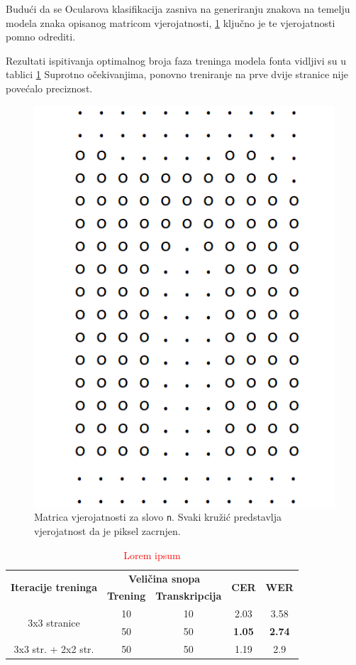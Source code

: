 \documentclass[zavrsnirad]{fer}
\begin{document}
\begin{multicols}{2}
	
Budući da se Ocularova klasifikacija zasniva na generiranju znakova na temelju modela znaka opisanog matricom vjerojatnosti, \ref{slk:matrica} ključno je te vjerojatnosti pomno odrediti.

Rezultati ispitivanja optimalnog broja faza treninga modela fonta vidljivi su u tablici \ref{tab:7.3}  Suprotno očekivanjima, ponovno treniranje na prve dvije stranice nije povećalo preciznost.

	\columnbreak
	
\begin{figure}[H]
	\centering
	\includegraphics[width=0.6\linewidth]{Figures/letter-matrix.png} 
	\caption{Matrica vjerojatnosti za slovo \texttt{n}. Svaki kružić predstavlja vjerojatnost da je piksel zacrnjen.}
	\label{slk:matrica}
\end{figure}

\end{multicols}



\bgroup
\def\arraystretch{1.25}
\begin{table}[h]
	\centering
	\begin{tabular}{|c|c|c|c|c|}
		\hline
		\multirow{2}{*}{\textbf{Iteracije treninga}} & \multicolumn{2}{c|}{\textbf{Veličina snopa}} & \multicolumn{1}{c|}{\multirow{2}{*}{\textbf{CER}}} & \multicolumn{1}{c|}{\multirow{2}{*}{\textbf{WER}}} \\ \cline{2-3}
		
		& \textbf{Trening}  & \textbf{Transkripcija}  & \multicolumn{1}{c|}{}  & \multicolumn{1}{c|}{}  \\ \hline
		\multirow{2}{*}{3x3 stranice} & 10 & 10 & 2.03 & 3.58  \\ \cline{2-5}
		 		& 50  & 50 & \textbf{1.05} & \textbf{2.74}   \\ \hline
		3x3 str. + 2x2 str. & 50 & 50 & 1.19 & 2.9 \\ \hline                                              
	\end{tabular}
	\caption{\textcolor{red}{Lorem ipsum}}
	\label{tab:7.3}
\end{table}
\egroup
\end{document}
